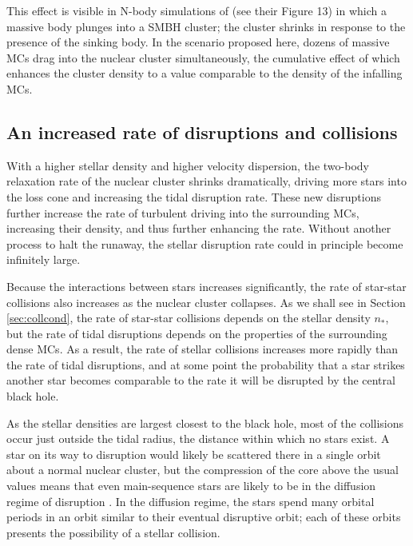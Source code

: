 \documentclass[preprint2]{aastex}
\begin{document}
This effect is visible in N-body simulations of \citet{Antonini:2012a} (see their Figure 13) in which a massive body plunges into a SMBH cluster; the cluster shrinks in response to the presence of the sinking body. In the scenario proposed here, dozens of massive MCs drag into the nuclear cluster simultaneously, the cumulative effect of which enhances the cluster density to a value comparable to the density of the infalling MCs.

\subsection{An increased rate of disruptions and collisions}\label{subsec:increase}

With a higher stellar density and higher velocity dispersion, the two-body relaxation rate of the nuclear cluster shrinks dramatically, driving more stars into the loss cone and increasing the tidal disruption rate. These new disruptions further increase the rate of turbulent driving into the surrounding MCs, increasing their density, and thus further enhancing the rate. Without another process to halt the runaway, the stellar disruption rate could in principle become infinitely large.

Because the interactions between stars increases significantly, the rate of star-star collisions also increases as the nuclear cluster collapses. As we shall see in Section \ref{sec:collcond}, the rate of star-star collisions depends on the stellar density $n_{\ast}$, but the rate of tidal disruptions depends on the properties of the surrounding dense MCs. As a result, the rate of stellar collisions increases more rapidly than the rate of tidal disruptions, and at some point the probability that a star strikes another star becomes comparable to the rate it will be disrupted by the central black hole. 

As the stellar densities are largest closest to the black hole, most of the collisions occur just outside the tidal radius, the distance within which no stars exist. A star on its way to disruption would likely be scattered there in a single orbit about a normal nuclear cluster, but the compression of the core above the usual values means that even main-sequence stars are likely to be in the diffusion regime of disruption \citep{Wang:2004a,MacLeod:2012a}. In the diffusion regime, the stars spend many orbital periods in an orbit similar to their eventual disruptive orbit; each of these orbits presents the possibility of a stellar collision.
\end{document}
